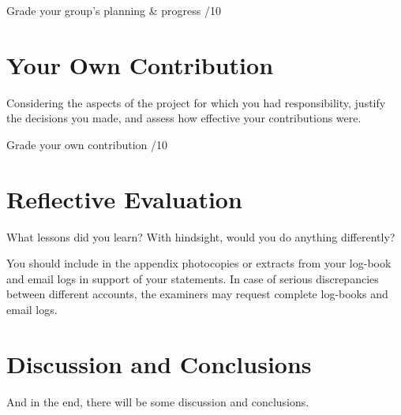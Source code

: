 \documentclass[journal]{IEEEtran}
\begin{document}
Grade your group's planning \& progress /10




\section{Your Own Contribution}
\label{sec:own_contribution}

Considering the aspects of the project for which you had responsibility, justify the decisions you made, and assess how effective your contributions were.  

Grade your own contribution /10



\section{Reflective Evaluation}
\label{sec:reflective_evaluation}

What lessons did you learn?  With hindsight, would you do anything differently?






\appendix

You should include in the appendix photocopies or extracts from your log-book and email logs in support of your statements.  In case of serious discrepancies between different accounts, the examiners may request complete log-books and email logs.







\section{Discussion and Conclusions}
\label{sec:conclusions}

And in the end, there will be some discussion and conclusions.


% 
% 
\end{document}
